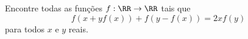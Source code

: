 Encontre todas as funções $f : \RR \to \RR$ tais que
$$ f(x + yf(x)) + f(y - f (x)) = 2xf(y)$$
para todos $x$ e $y$ reais.
